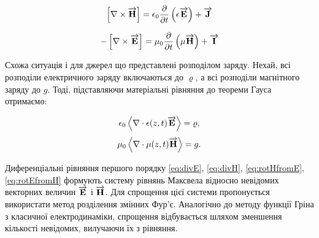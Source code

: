 %
\begin{equation} \label{eq:rotHfromE}
\left[ \nabla \times \overrightarrow{\mathbf H} \right] = 
\epsilon_0 \frac{\partial }{\partial t} \left( \epsilon \overrightarrow{\mathbf E} \right) + \overrightarrow{\mathbf J}
\end{equation}

\begin{equation} \label{eq:rotEfromH} 
- \left[ \nabla \times \overrightarrow{\mathbf E} \right] = 
\mu_0 \frac{\partial }{\partial t} \left( \mu \overrightarrow{\mathbf H} \right) + \overrightarrow{\mathbf I}
\end{equation}

Схожа ситуація і для джерел що представлені розподілом заряду. Нехай,
всі розподіли електричного заряду включаються до $ \varrho $, а всі розподіли 
магнітного заряду до $ g $. Тоді, підставляючи матеріальні рівняння до теореми 
Гауса отримаємо:

%
\begin{equation} \label{eq:divE} 
\epsilon_0 \left< \nabla \cdot  \epsilon(z,t) \overrightarrow{\mathbf E}  \right> = \varrho,
\end{equation}
%
\begin{equation} \label{eq:divH}
\mu_0 \left< \nabla \cdot  \mu(z,t) \overrightarrow{\mathbf H}  \right> = g.
\end{equation}

Диференціальні рівняння першого порядку \eqref{eq:divE}, \eqref{eq:divH}, 
\eqref{eq:rotHfromE}, \eqref{eq:rotEfromH} формують систему 
рівнянь Максвела відносно невідомих векторних величин $ \overrightarrow{\mathbf E} $ і 
$ \overrightarrow{\mathbf H} $. Для спрощення цієї системи пропонується використати метод 
розділення змінних Фур'є. Аналогічно до методу функції Гріна з класичної 
електродинаміки, спрощення відбувається шляхом зменшення кількості невідомих,
вилучаючи їх з рівняння.

